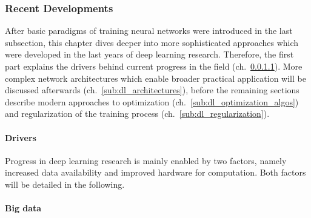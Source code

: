 \subsubsection{Recent Developments}
\label{sub:dl_developments}

After basic paradigms of training neural networks were introduced in the last
subsection, this chapter dives deeper into more sophisticated approaches
which were developed in the last years of deep learning research.
Therefore, the first part explains the drivers behind current progress in the
field (ch.~\ref{sub:dl_drivers}). More complex network architectures which enable
broader practical application will be discussed afterwards (ch.~\ref{sub:dl_architectures}),
before the remaining sections describe modern approaches to optimization
(ch.~\ref{sub:dl_optimization_algos}) and regularization of the training process
(ch.~\ref{sub:dl_regularization}).

\paragraph{Drivers}
\label{sub:dl_drivers}

Progress in deep learning research is mainly enabled by two factors, namely
increased data availability and improved hardware for computation.
Both factors will be detailed in the following.

\paragraph{Big data}

